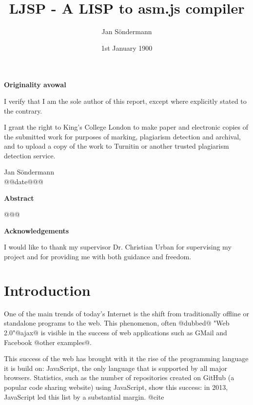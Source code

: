 \documentclass[11pt]{report}
\title{LJSP - A LISP to asm.js compiler}
\author{Jan S\"ondermann}
\date{1st January 1900}
\begin{document}



\maketitle

\begin{center}
\textbf{Originality avowal}
\end{center}

I verify that I am the sole author of this report, except where explicitly stated to the contrary.

I grant the right to King's College London to make paper and electronic copies of the submitted work for purposes of marking, plagiarism detection and archival, and to upload a copy of the work to Turnitin or another trusted plagiarism detection service.

\begin{flushright}
Jan Söndermann \\
@@date@@@
\end{flushright}
\newpage
			
\begin{center}
\textbf{Abstract}
\end{center}

@@@
\newpage

\begin{center}
\textbf{Acknowledgements}
\end{center}
I would like to thank my supervisor Dr. Christian Urban for supervising my project and for providing me with both guidance and freedom.
\newpage

\tableofcontents
\newpage

\chapter{Introduction}
One of the main trends of today's Internet is the shift from traditionally offline or standalone programs to the web. This phenomenon, often @dubbed@ "Web 2.0"@ajax@ is visible in the success of web applications such as GMail and Facebook @other examples@.

This success of the web has brought with it the rise of the programming language it is build on: JavaScript, the only language that is supported by all major browsers. Statistics, such as the number of repositories created on GitHub (a popular code sharing website) using JavaScript, show this success: in 2013, JavaScript led this list by a substantial margin. @cite
\end{document}
